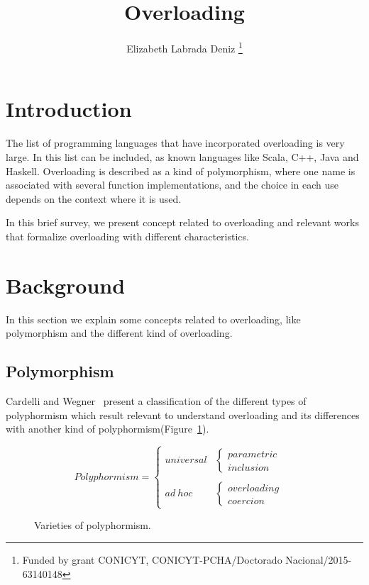 \documentclass[hidelinks, twocolumn]{article}
\title{\bf Overloading}
\author{Elizabeth Labrada Deniz
\thanks{Funded by grant CONICYT, CONICYT-PCHA/Doctorado Nacional/2015-63140148}}
\affil{Computer Science Department (DCC), University of Chile, Chile}
\date{}
\begin{document}

\setlength{\columnsep}{20pt} %

	\maketitle
	\renewcommand{\abstractname}{Abstract}	
	\begin{abstract}
	\end{abstract}	
\section{Introduction}
The list of programming languages that have incorporated overloading is very large. In this list can be included, as known languages like Scala, C++, Java and Haskell. Overloading is described as a kind of polymorphism, where one name is associated with several function implementations, and the choice in each use depends on the context where it is used.

In this brief survey, we present concept related to overloading and relevant works that formalize overloading with different characteristics.
\section{Background}\label{section:concepts}
In this section we explain some concepts related to overloading, like polymorphism and the different kind of overloading.
\subsection{Polymorphism}
Cardelli and Wegner~\cite{CardelliWegner} present a classification of the different types of polyphormism which result relevant to understand overloading and its differences with another kind of polyphormism(Figure~\ref{figure:varpolyphormism}).

\begin{figure}[h]
\begin{center}
\[ Polyphormism = 
\begin{cases} 
     universal & 
     \begin{cases} 
     	parametric &\\
     	inclusion &
   	\end{cases} \\
		 & \\
     ad \ hoc & 
     \begin{cases} 
     	overloading & \\
     	coercion &
   	\end{cases}
 \end{cases}
\]
\caption{Varieties of polyphormism.}
\label{figure:varpolyphormism}
\end{center}
\end{figure}
\end{document}

